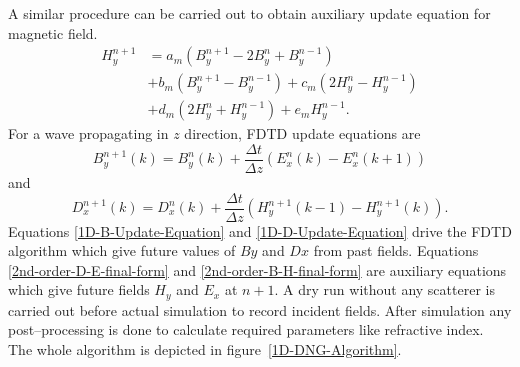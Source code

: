 \documentclass{article}
\begin{document}
A similar procedure can be carried out to obtain auxiliary update equation for magnetic field.
\begin{equation}
\begin{split}
H^{n+1}_y&=a_m\left(B^{n+1}_y-2B^n_y+B^{n-1}_y\right)\\&+b_m\left(B^{n+1}_y-B^{n-1}_y\right)
+c_m\left(2H^n_y-H^{n-1}_y\right)\\&+d_m\left(2H^n_y+H^{n-1}_y\right)+e_m H^{n-1}_y.
\end{split}
\label{2nd-order-B-H-final-form}
\end{equation}
For a wave propagating in $z$ direction, FDTD update equations are
\begin{equation}
B^{n+1}_y(k)=B^n_y(k)+\dfrac{\Delta t}{\Delta z}\left(E^n_x(k)-E^n_x(k+1)\right)
\label{1D-B-Update-Equation}
\end{equation}
and
\begin{equation}
D^{n+1}_x(k)=D^n_x(k)+\dfrac{\Delta t}{\Delta z}\left(H^{n+1}_y(k-1)-H^{n+1}_y(k)\right).
\label{1D-D-Update-Equation}
\end{equation}
Equations \ref{1D-B-Update-Equation} and \ref{1D-D-Update-Equation} drive the FDTD algorithm which give future values of $By$ and $Dx$ from past fields. Equations \ref{2nd-order-D-E-final-form} and \ref{2nd-order-B-H-final-form} are auxiliary equations which give future fields $H_y$ and $E_x$ at $n+1$. A dry run without any scatterer is carried out before actual simulation to record incident fields. After simulation any post--processing is done to calculate required parameters like refractive index. The whole algorithm is depicted in figure~\ref{1D-DNG-Algorithm}.
\end{document}
